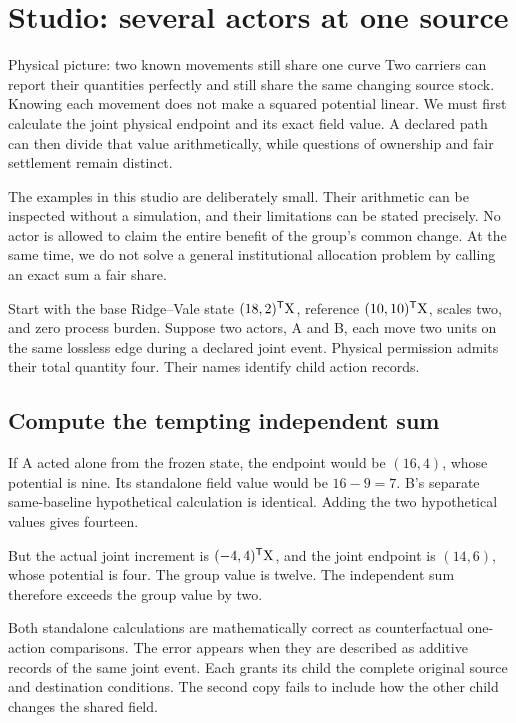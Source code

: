 \chapter{Studio: several actors at one source}\label{ch:studio-group}

\begin{intuitionbox}{Physical picture: two known movements still share one curve}
Two carriers can report their quantities perfectly and still share the same changing source stock. Knowing each movement does not make a squared potential linear. We must first calculate the joint physical endpoint and its exact field value. A declared path can then divide that value arithmetically, while questions of ownership and fair settlement remain distinct.
\end{intuitionbox}

The examples in this studio are deliberately small. Their arithmetic can be inspected without a simulation, and their limitations can be stated precisely. No actor is allowed to claim the entire benefit of the group's common change. At the same time, we do not solve a general institutional allocation problem by calling an exact sum a fair share.

Start with the base Ridge--Vale state \((18,2)^{\mathsf T}\mathrm{X}\), reference \((10,10)^{\mathsf T}\mathrm{X}\), scales two, and zero process burden. Suppose two actors, A and B, each move two units on the same lossless edge during a declared joint event. Physical permission admits their total quantity four. Their names identify child action records.

\section{Compute the tempting independent sum}

If A acted alone from the frozen state, the endpoint would be \((16,4)\), whose potential is nine. Its standalone field value would be \(16-9=7\). B's separate same-baseline hypothetical calculation is identical. Adding the two hypothetical values gives fourteen.

But the actual joint increment is \((-4,4)^{\mathsf T}\mathrm{X}\), and the joint endpoint is \((14,6)\), whose potential is four. The group value is twelve. The independent sum therefore exceeds the group value by two.

Both standalone calculations are mathematically correct as counterfactual one-action comparisons. The error appears when they are described as additive records of the same joint event. Each grants its child the complete original source and destination conditions. The second copy fails to include how the other child changes the shared field.

